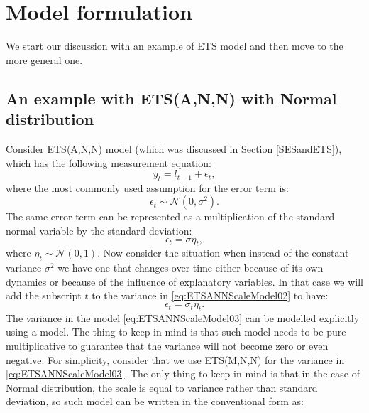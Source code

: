 \documentclass[
]{book}
\theoremstyle{definition}
\theoremstyle{definition}
\theoremstyle{definition}
\theoremstyle{definition}
\theoremstyle{remark}
\begin{document}
\hypertarget{model-formulation-1}{%
\section{Model formulation}\label{model-formulation-1}}

We start our discussion with an example of ETS model and then move to the more general one.

\hypertarget{an-example-with-etsann-with-normal-distribution}{%
\subsection{An example with ETS(A,N,N) with Normal distribution}\label{an-example-with-etsann-with-normal-distribution}}

Consider ETS(A,N,N) model (which was discussed in Section \ref{SESandETS}), which has the following measurement equation:
\begin{equation}
    y_t = l_{t-1} + \epsilon_t,
    \label{eq:ETSANNScaleModel01}
\end{equation}
where the most commonly used assumption for the error term is:
\begin{equation*}
    \epsilon_t \sim \mathcal{N}(0, \sigma^2) .
\end{equation*}
The same error term can be represented as a multiplication of the standard normal variable by the standard deviation:
\begin{equation}
    \epsilon_t = \sigma \eta_t,
    \label{eq:ETSANNScaleModel02}
\end{equation}
where \(\eta_t \sim \mathcal{N}(0, 1)\). Now consider the situation when instead of the constant variance \(\sigma^2\) we have one that changes over time either because of its own dynamics or because of the influence of explanatory variables. In that case we will add the subscript \(t\) to the variance in \eqref{eq:ETSANNScaleModel02} to have:
\begin{equation}
    \epsilon_t = \sigma_t \eta_t.
    \label{eq:ETSANNScaleModel03}
\end{equation}
The variance in the model \eqref{eq:ETSANNScaleModel03} can be modelled explicitly using a model. The thing to keep in mind is that such model needs to be pure multiplicative to guarantee that the variance will not become zero or even negative. For simplicity, consider that we use ETS(M,N,N) for the variance in \eqref{eq:ETSANNScaleModel03}. The only thing to keep in mind is that in the case of Normal distribution, the scale is equal to variance rather than standard deviation, so such model can be written in the conventional form as:
\end{document}
